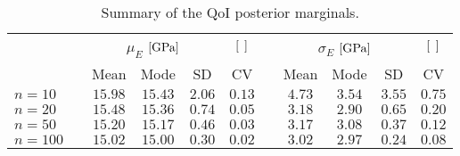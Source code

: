 \begin{table}[ht]
  \caption[Summary of the QoI posterior marginals]{Summary of the QoI posterior marginals.}
  \label{tab:PEM:ProbInf:Summary}
  \centering
  \begin{tabular}{lcccccccccc}
    \toprule
    & \phantom{} & \multicolumn{3}{c}{\(\mu_E\) \(\lbrack\unit[]{GPa}\rbrack\)} & \(\lbrack \;\, \rbrack\)
    & \phantom{} & \multicolumn{3}{c}{\(\sigma_E\) \(\lbrack\unit[]{GPa}\rbrack\)} & \(\lbrack \;\, \rbrack\) \\
    \cmidrule{3-6} \cmidrule{8-11}
    && Mean & Mode & SD & CV && Mean & Mode & SD & CV \\
    \midrule
    \(n=10\)  && \(15.98\) & \(15.43\) & \(2.06\) & \(0.13\) && \(4.73\) & \(3.54\) & \(3.55\) & \(0.75\) \\
    \(n=20\)  && \(15.48\) & \(15.36\) & \(0.74\) & \(0.05\) && \(3.18\) & \(2.90\) & \(0.65\) & \(0.20\) \\
    \(n=50\)  && \(15.20\) & \(15.17\) & \(0.46\) & \(0.03\) && \(3.17\) & \(3.08\) & \(0.37\) & \(0.12\) \\
    \(n=100\) && \(15.02\) & \(15.00\) & \(0.30\) & \(0.02\) && \(3.02\) & \(2.97\) & \(0.24\) & \(0.08\) \\
    \bottomrule
  \end{tabular}
\end{table}

